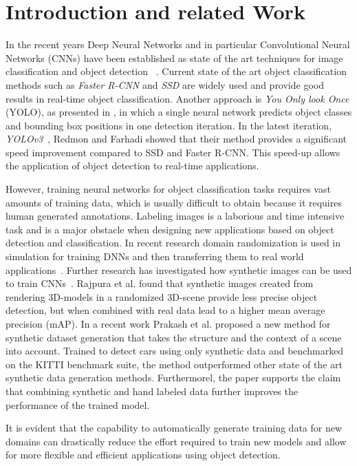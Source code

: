 \section{Introduction and related Work}
In the recent years Deep Neural Networks and in particular Convolutional Neural Networks (CNNs) have been established as state of the art techniques for image classification and object detection ~\cite{szegedy2015going,rajpura2017object}.
Current state of the art object classification methods such as \textit{Faster R-CNN} and \textit{SSD} are widely used and provide good results in real-time object classification.
Another approach is \textit{You Only look Once} (YOLO), as presented in \cite{redmon2016you}, in which a single neural network predicts object classes and bounding box positions in one detection iteration.
In the latest iteration, \textit{YOLOv3}~\cite{redmon2018yolov3}, Redmon and Farhadi showed that their method provides a significant speed improvement compared to SSD and Faster R-CNN.
This speed-up allows the application of object detection to real-time applications.

However, training neural networks for object classification tasks requires vast amounts of training data, which is usually difficult to obtain because it requires human generated annotations.
Labeling images is a laborious and time intensive task and is a major obstacle when designing new applications based on object detection and classification.
In recent research domain randomization is used in simulation for training DNNs and then transferring them to real world applications~\cite{tobin2017domain}.
Further research has investigated how synthetic images can be used to train CNNs~\cite{rajpura2017object,prakash2018structured}.
Rajpura et al. found that synthetic images created from rendering 3D-models in a randomized 3D-scene provide less precise object detection, but when combined with real data lead to a higher mean average precision (mAP).
In a recent work Prakash et al. proposed a new method for synthetic dataset generation that takes the structure and the context of a scene into account.
Trained to detect cars using only synthetic data and benchmarked on the KITTI benchmark suite, the method outperformed other state of the art synthetic data generation methods.
Furthermorel, the paper supports the claim that combining synthetic and hand labeled data further improves the performance of the trained model.

It is evident that the capability to automatically generate training data for new domains can drastically reduce the effort required to train new models and allow for more flexible and efficient applications using object detection.

